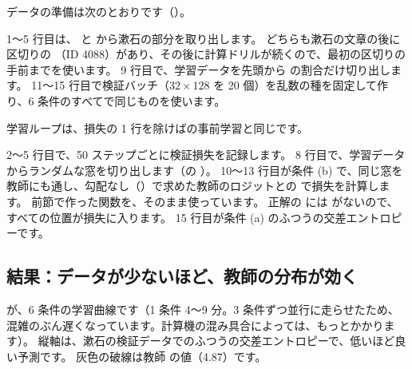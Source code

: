 データの準備は次のとおりです（）。


1〜5 行目は、 と  から漱石の部分を取り出します。
どちらも漱石の文章の後に区切りの （ID 4088）があり、その後に計算ドリルが続くので、最初の区切りの手前までを使います。
9 行目で、学習データを先頭から  の割合だけ切り出します。
11〜15 行目で検証バッチ（$32\times128$ を 20 個）を乱数の種を固定して作り、6 条件のすべてで同じものを使います。

学習ループは、損失の 1 行を除けばの事前学習と同じです。

\begingroup{}
\endgroup

2〜5 行目で、50 ステップごとに検証損失を記録します。
8 行目で、学習データからランダムな窓を切り出します（の ）。
10〜13 行目が条件 (b) で、同じ窓を教師にも通し、勾配なし（）で求めた教師のロジットとの  で損失を計算します。
前節で作った関数を、そのまま使っています。
正解の  には  がないので、すべての位置が損失に入ります。
15 行目が条件 (a) のふつうの交差エントロピーです。

\subsection{結果：データが少ないほど、教師の分布が効く}\label{sec:distill-exp-result}

が、6 条件の学習曲線です（1 条件 4〜9 分。3 条件ずつ並行に走らせたため、混雑のぶん遅くなっています。計算機の混み具合によっては、もっとかかります）。
縦軸は、漱石の検証データでのふつうの交差エントロピーで、低いほど良い予測です。
灰色の破線は教師  の値（4.87）です。

